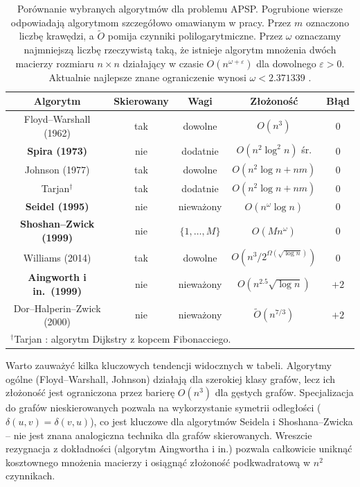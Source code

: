 \begin{table}[h!]
\centering
\small
\setlength{\tabcolsep}{5pt}
\renewcommand{\arraystretch}{1.2}
\begin{tabular}{|c|c|c|c|c|}
\hline
\textbf{Algorytm} & \textbf{Skierowany} & \textbf{Wagi} 
  & \textbf{Złożoność} & \textbf{Błąd} \\
\hline
Floyd--Warshall (1962) & tak & dowolne & $O(n^3)$ & 0 \\
\hline
\textbf{Spira (1973)} & nie & dodatnie
  & $O(n^2 \log^2 n)$ śr. & 0 \\
\hline
Johnson (1977) & tak & dowolne & $O(n^2 \log n + nm)$ & 0 \\
\hline
Tarjan$^{\dag}$ 
  & tak & dodatnie & $O(n^2 \log n + nm)$ & 0 \\
\hline
\textbf{Seidel (1995)} & nie & nieważony & $O(n^\omega \log n)$ & 0 \\
\hline
\textbf{Shoshan--Zwick (1999)} & nie & $\{1,\ldots,M\}$ 
  & $O(Mn^\omega)$ & 0 \\
\hline
Williams (2014) & tak & dowolne 
  & $O\!\left(n^3 / 2^{\Omega(\sqrt{\log n})}\right)$ & 0 \\
\hline
\textbf{Aingworth i in.\ (1999)} & nie & nieważony 
  & $O(n^{2.5}\sqrt{\log n})$ & $+2$ \\
\hline
Dor--Halperin--Zwick (2000) & nie & nieważony 
  & $\tilde{O}(n^{7/3})$ & $+2$ \\
\hline
\multicolumn{5}{l}{%
  \footnotesize $^{\dag}$Tarjan \cite{FredmanTarjan1984}:
  algorytm Dijkstry z kopcem Fibonacciego.}
\end{tabular}
\caption{Porównanie wybranych algorytmów dla problemu APSP\@.
Pogrubione wiersze odpowiadają algorytmom szczegółowo omawianym
w pracy. Przez $m$ oznaczono liczbę krawędzi,
a $\tilde{O}$ pomija czynniki polilogarytmiczne. Przez $\omega$ oznaczamy najmniejszą liczbę rzeczywistą taką, że istnieje algorytm mnożenia dwóch macierzy rozmiaru $n \times n$ działający w czasie $O(n^{\omega + \varepsilon})$ dla dowolnego $\varepsilon > 0$.
Aktualnie najlepsze znane ograniczenie wynosi $\omega < 2{.}371339$ \cite{Alman2024}.}
\label{tab:apsp}
\end{table}
 
Warto zauważyć kilka kluczowych tendencji widocznych w tabeli. Algorytmy ogólne (Floyd--Warshall, Johnson) działają dla szerokiej klasy grafów, lecz ich złożoność jest ograniczona przez barierę $O(n^3)$ dla gęstych grafów. Specjalizacja do grafów nieskierowanych pozwala na wykorzystanie symetrii odległości ($\delta(u,v) = \delta(v,u)$), co jest kluczowe dla algorytmów Seidela i Shoshana--Zwicka -- nie jest znana analogiczna technika dla grafów skierowanych. Wreszcie rezygnacja z dokładności (algorytm Aingwortha i in.) pozwala całkowicie uniknąć kosztownego mnożenia macierzy i osiągnąć złożoność podkwadratową w $n^2$ czynnikach.
 

